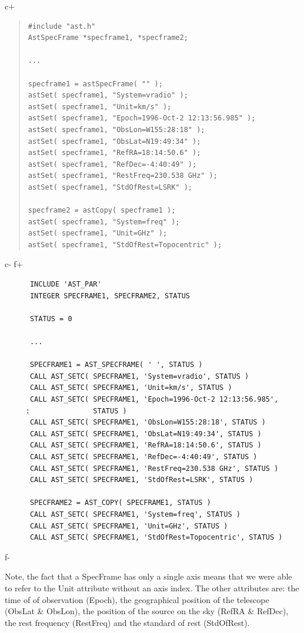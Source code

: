 \documentclass[twoside,11pt]{article}
\begin{document}
c+
\begin{quote}
\small
\begin{verbatim}
#include "ast.h"
AstSpecFrame *specframe1, *specframe2;

...

specframe1 = astSpecFrame( "" );
astSet( specframe1, "System=vradio" );
astSet( specframe1, "Unit=km/s" );
astSet( specframe1, "Epoch=1996-Oct-2 12:13:56.985" );
astSet( specframe1, "ObsLon=W155:28:18" );
astSet( specframe1, "ObsLat=N19:49:34" );
astSet( specframe1, "RefRA=18:14:50.6" );
astSet( specframe1, "RefDec=-4:40:49" );
astSet( specframe1, "RestFreq=230.538 GHz" );
astSet( specframe1, "StdOfRest=LSRK" );

specframe2 = astCopy( specframe1 );
astSet( specframe1, "System=freq" );
astSet( specframe1, "Unit=GHz" );
astSet( specframe1, "StdOfRest=Topocentric" );

\end{verbatim}
\normalsize
\end{quote}
c-
f+
\small
\begin{verbatim}
      INCLUDE 'AST_PAR'
      INTEGER SPECFRAME1, SPECFRAME2, STATUS

      STATUS = 0

      ...

      SPECFRAME1 = AST_SPECFRAME( ' ', STATUS )
      CALL AST_SETC( SPECFRAME1, 'System=vradio', STATUS )
      CALL AST_SETC( SPECFRAME1, 'Unit=km/s', STATUS )
      CALL AST_SETC( SPECFRAME1, 'Epoch=1996-Oct-2 12:13:56.985', 
     :               STATUS )
      CALL AST_SETC( SPECFRAME1, 'ObsLon=W155:28:18', STATUS )
      CALL AST_SETC( SPECFRAME1, 'ObsLat=N19:49:34', STATUS )
      CALL AST_SETC( SPECFRAME1, 'RefRA=18:14:50.6', STATUS )
      CALL AST_SETC( SPECFRAME1, 'RefDec=-4:40:49', STATUS )
      CALL AST_SETC( SPECFRAME1, 'RestFreq=230.538 GHz', STATUS )
      CALL AST_SETC( SPECFRAME1, 'StdOfRest=LSRK', STATUS )
      
      SPECFRAME2 = AST_COPY( SPECFRAME1, STATUS )
      CALL AST_SETC( SPECFRAME1, 'System=freq', STATUS )
      CALL AST_SETC( SPECFRAME1, 'Unit=GHz', STATUS )
      CALL AST_SETC( SPECFRAME1, 'StdOfRest=Topocentric', STATUS )

\end{verbatim}
\normalsize
f-

Note, the fact that a SpecFrame has only a single axis means that we were
able to refer to the Unit attribute without an axis index. The other
attributes are: the time of of observation (Epoch), the geographical
position of the telescope (ObsLat \& ObsLon), the position of the source
on the sky (RefRA \& RefDec), the rest frequency (RestFreq) and the
standard of rest (StdOfRest).
\end{document}
